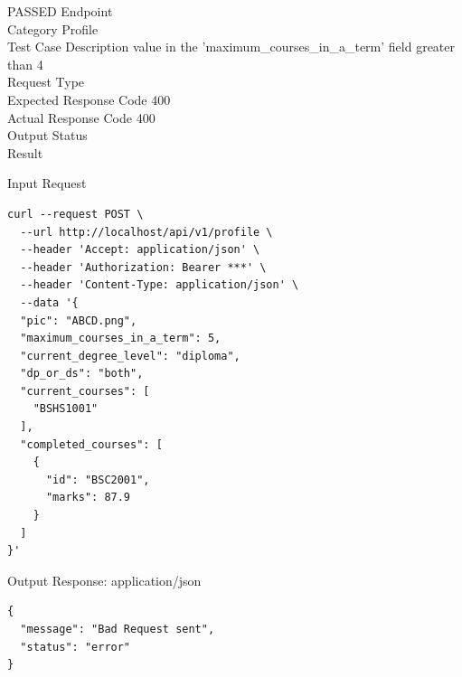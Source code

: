 \begin{testcase}{12}{PASSED}
Endpoint \hfill {}\\
Category \hfill Profile\\
Test Case Description \hfill value in the 'maximum\_courses\_in\_a\_term' field greater than 4\\

Request Type    \hfill {}\\
Expected Response Code    \hfill 400\\
Actual Response Code    \hfill 400\\

Output Status \hfill {}\\
Result \hfill {}

\begin{ipblock}{Input Request}
\begin{verbatim}
curl --request POST \
  --url http://localhost/api/v1/profile \
  --header 'Accept: application/json' \
  --header 'Authorization: Bearer ***' \
  --header 'Content-Type: application/json' \
  --data '{
  "pic": "ABCD.png",
  "maximum_courses_in_a_term": 5,
  "current_degree_level": "diploma",
  "dp_or_ds": "both",
  "current_courses": [
    "BSHS1001"
  ],
  "completed_courses": [
    {
      "id": "BSC2001",
      "marks": 87.9
    }
  ]
}'
\end{verbatim}
\end{ipblock}

\begin{opblock}{Output Response: application/json}
\begin{verbatim}
{
  "message": "Bad Request sent",
  "status": "error"
}
\end{verbatim}
\end{opblock}
\end{testcase}


